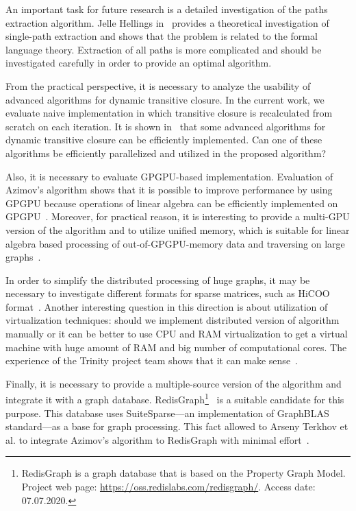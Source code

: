 An important task for future research is a detailed investigation of the paths extraction algorithm.
Jelle Hellings in~\cite{HellSinglePath} provides a theoretical investigation of single-path extraction and shows that the problem is related to the formal language theory.
Extraction of all paths is more complicated and should be investigated carefully in order to provide an optimal algorithm.


From the practical perspective, it is necessary to analyze the usability of advanced algorithms for dynamic transitive closure.
In the current work, we evaluate naive implementation in which transitive closure is recalculated from scratch on each iteration.
It is shown in~\cite{cs6345} that some advanced algorithms for dynamic transitive closure can be efficiently implemented.
Can one of these algorithms be efficiently parallelized and utilized in the proposed algorithm?


Also, it is necessary to evaluate GPGPU-based implementation.
Evaluation of Azimov's algorithm shows that it is possible to improve performance by using GPGPU because operations of linear algebra can be efficiently implemented on GPGPU~\cite{Mishin:2019:ECP:3327964.3328503,10.1145/3398682.3399163}.
Moreover, for practical reason, it is interesting to provide a multi-GPU version of the algorithm and to utilize unified memory, which is suitable for linear algebra based processing of out-of-GPGPU-memory data and traversing on large graphs~\cite{8946118,10.14778/3384345.3384358}.

In order to simplify the distributed processing of huge graphs, it may be necessary to investigate different formats for sparse matrices, such as HiCOO format~\cite{10.5555/3291656.3291682}.
Another interesting question in this direction is about utilization of virtualization techniques: should we implement distributed version of algorithm manually or it can be better to use CPU and RAM virtualization to get a virtual machine with huge amount of RAM and big number of computational cores.
The experience of the Trinity project team shows that it can make sense~\cite{10.1145/2463676.2467799}.

Finally, it is necessary to provide a multiple-source version of the algorithm and integrate it with a graph database.
RedisGraph\footnote{RedisGraph is a graph database that is based on the Property Graph
Model. Project web page: \url{https://oss.redislabs.com/redisgraph/}. Access date:
07.07.2020.}~\cite{8778293} is a suitable candidate for this purpose.
This database uses SuiteSparse---an implementation of GraphBLAS standard---as a base for graph processing.
This fact allowed to Arseny Terkhov et al.  to integrate Azimov's algorithm to RedisGraph with minimal effort~\cite{10.1145/3398682.3399163}.
